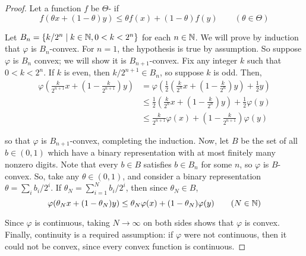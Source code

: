\begin{proof}
    Let a function $f$ be $\Theta$- if 
    $$
        f(\theta x + (1 - \theta) y) \leq \theta f(x) + (1 - \theta) f(y) 
        \qquad (\theta \in \Theta)
    $$

    Let $B_n = \{k / 2^n \mid k \in \mathbb{N}, 0 < k < 2^n\}$ for each $n \in \mathbb{N}$. We will prove by induction that $\varphi$ is $B_n$-convex. For $n=1$, the hypothesis is true by assumption. So suppose $\varphi$ is $B_n$ convex; we will show it is $B_{n+1}$-convex. Fix any integer $k$ such that $0 < k < 2^n$. If $k$ is even, then $k/2^{n+1} \in B_n$, so suppose $k$ is odd. Then, 
    \begin{align*}
        \varphi \left( \frac{k}{2^{n+1}} x + \left(1 - \frac{k}{2^{n+1}}\right) y \right)
        &= \varphi \left( \frac{1}{2} \left( \frac{k}{2^n} x + \left(1 - \frac{k}{2^n}\right) y \right) + \frac{1}{2} y \right) \\
        &\leq \frac{1}{2} \left( \frac{k}{2^n} x + \left( 1 - \frac{k}{2^n} \right) y \right) + \frac{1}{2} \varphi(y) \\
        &\leq \frac{k}{2^{n+1}} \varphi(x) + \left(1 - \frac{k}{2^{n+1}} \right) \varphi(y)
    \end{align*}

    so that $\varphi$ is $B_{n+1}$-convex, completing the induction. Now, let $B$ be the set of all $b \in (0, 1)$ which have a binary representation with at most finitely many nonzero digits. Note that every $b \in B$ satisfies $b \in B_n$ for some $n$, so $\varphi$ is $B$-convex. So, take any $\theta \in (0, 1)$, and consider a binary representation $\theta = \sum_i b_i / 2^i$. If $\theta_N = \sum_{i=1}^N b_i / 2^i$, then since $\theta_N \in B$, 
    $$
        \varphi(\theta_N x + (1 - \theta_N) y) \leq \theta_N \varphi(x) + (1 - \theta_N) \varphi(y)
        \qquad (N \in \mathbb{N})
    $$

    Since $\varphi$ is continuous, taking $N \to \infty$ on both sides shows that $\varphi$ is convex. Finally, continuity is a required assumption: if $\varphi$ were not continuous, then it could not be convex, since every convex function is continuous. 
    \end{proof}

